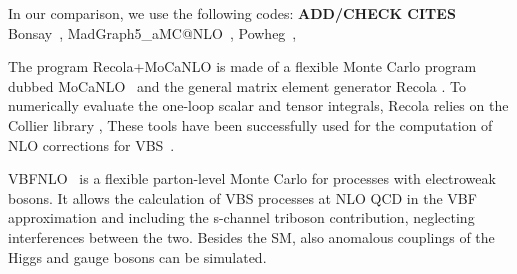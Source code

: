 In our comparison, we use the following codes: {\bf ADD/CHECK CITES} 
{\sc Bonsay}~\cite{},
{\sc MadGraph5\_aMC@NLO}~\cite{Alwall:2014hca}, 
{\sc Powheg}~\cite{},

The program {\sc Recola+MoCaNLO} is made of a flexible Monte Carlo program dubbed {\sc MoCaNLO}~\cite{MoCaNLO} and the general matrix element generator {\sc Recola} \cite{Actis:2012qn,Actis:2016mpe}.
To numerically evaluate the one-loop scalar and tensor integrals, {\sc Recola} relies on the {\sc Collier} library \cite{Denner:2014gla,Denner:2016kdg},
These tools have been successfully used for the computation of NLO corrections for VBS~\cite{Biedermann:2016yds,Biedermann:2017bss}.

{\sc VBFNLO}~\cite{Arnold:2008rz, Arnold:2011wj, Baglio:2014uba} is a flexible
parton-level Monte Carlo for processes with electroweak bosons. It
allows the calculation of VBS processes at NLO QCD in the VBF
approximation and including the s-channel triboson contribution,
neglecting interferences between the two. Besides the SM, also anomalous
couplings of the Higgs and gauge bosons can be simulated.


